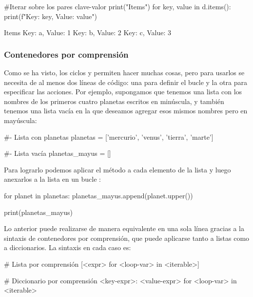 \begin{pyin}[]
#Iterar sobre los pares clave-valor
print("Items")
for key, value in d.items():
    print(f"Key: {key}, Value: {value}")
\end{pyin}
\begin{pyprint}
Items
Key: a, Value: 1
Key: b, Value: 2
Key: c, Value: 3   
\end{pyprint}

\subsubsection{Contenedores por comprensión}
Como se ha visto, los ciclos  y  permiten hacer muchas cosas, pero para usarlos se necesita de al menos dos líneas de código: una para definir el bucle y la otra para especificar las acciones. Por ejemplo, supongamos que tenemos una lista con los nombres de los primeros cuatro planetas escritos en minúscula, y también tenemos una lista vacía en la que deseamos agregar esos mismos nombres pero en mayúscula:

\begin{pyin}[]
#- Lista con planetas
planetas = ['mercurio', 'venus', 'tierra', 'marte']

#- Lista vacía
planetas_mayus = []
\end{pyin}

Para lograrlo podemos aplicar el método  a cada elemento de la lista  y luego anexarlos a la lista  en un bucle :

\begin{pyin}
for planet in planetas:
    planetas_mayus.append(planet.upper())

print(planetas_mayus)
\end{pyin}
\begin{pyprint}
\end{pyprint}

Lo anterior puede realizarse de manera equivalente en una sola línea gracias a la sintaxis de contenedores por comprensión, que puede aplicarse tanto a listas como a diccionarios. La sintaxis en cada caso es:

\begin{shell}[]
# Lista por comprensión
[<expr> for <loop-var> in <iterable>]

# Diccionario por comprensión
{<key-expr>: <value-expr> for <loop-var> in <iterable>}
\end{shell}

